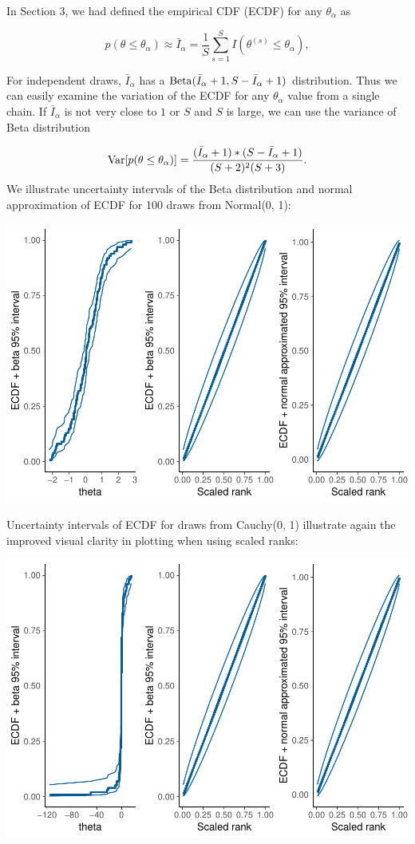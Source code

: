 \documentclass[american,]{article}
\begin{document}
In Section 3, we had defined the empirical CDF (ECDF) for any
\(\theta_\alpha\) as

\[
p(\theta \leq \theta_\alpha) \approx \bar{I}_\alpha = \frac{1}{S}\sum_{s=1}^S
I(\theta^{(s)} \leq\theta_\alpha),
\]

For independent draws, \(\bar{I}_\alpha\) has a
\({\rm Beta}(\bar{I}_\alpha+1, S - \bar{I}_\alpha + 1)\) distribution.
Thus we can easily examine the variation of the ECDF for any
\(\theta_\alpha\) value from a single chain. If \(\bar{I}_\alpha\) is
not very close to \(1\) or \(S\) and \(S\) is large, we can use the
variance of Beta distribution

\[
{\rm Var}[p(\theta \leq \theta_\alpha)] =
\frac{(\bar{I}_\alpha+1)*(S-\bar{I}_\alpha+1)}{(S+2)^2(S+3)}.
\] We illustrate uncertainty intervals of the Beta distribution and
normal approximation of ECDF for 100 draws from Normal(0, 1):

\includegraphics{graphics/ranknorm-beta-1.pdf}

Uncertainty intervals of ECDF for draws from Cauchy(0, 1) illustrate
again the improved visual clarity in plotting when using scaled ranks:

\includegraphics{graphics/ranknorm-cauchy3-1.pdf}
\end{document}
